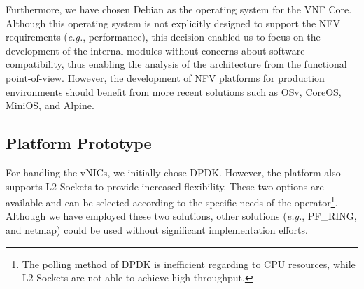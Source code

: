 \begin{itemize}
\end{itemize}

Furthermore, we have chosen Debian as the operating system for the VNF Core. Although this operating system is not explicitly designed to support the NFV requirements (\textit{e.g.}, performance), this decision enabled us to focus on the development of the internal modules without concerns about software compatibility, thus enabling the analysis of the architecture from the functional point-of-view. However, the development of NFV platforms for production environments should benefit from more recent solutions such as OSv, CoreOS, MiniOS, and Alpine.



\subsection{Platform Prototype}


For handling the vNICs, we initially chose DPDK. However, the platform also supports L2 Sockets to provide increased flexibility. These two options are available and can be selected according to the specific needs of the operator\footnote{The polling method of DPDK is inefficient regarding to CPU resources, while L2 Sockets are not able to achieve high throughput.}. Although we have employed these two solutions, other solutions (\textit{e.g.}, PF\_RING, and netmap) could be used without significant implementation efforts.

